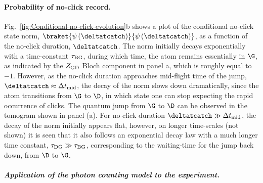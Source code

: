 \paragraph{Probability of no-click record.}

Fig.~\ref{fig:Conditional-no-click-evolution}b shows a plot of the
conditional no-click state norm, $\braket{\psi\left(\deltatcatch\right)}{\psi\left(\deltatcatch\right)}$,
as a function of the no-click duration, $\deltatcatch$. The norm
initially decays exponentially with a time-constant $\tau_{{\rm BG}}$,
during which time, the atom remains essentially in $\G$, as indicated
by the $Z_{{\rm GD}}$ Bloch component in panel a, which is roughly
equal to $-1$. However, as the no-click duration approaches  mid-flight
time of the jump, $\deltatcatch\approx\Delta t_{{\rm mid}}$, the
decay of the norm slows down dramatically, since the atom transitions
from $\G$ to $\D$, in which state one can stop expecting the rapid
occurrence of clicks. The quantum jump from $\G$ to $\D$ can be
observed in the tomogram shown in panel (a). For no-click duration
$\deltatcatch\gg\Delta t_{{\rm mid}}$, the decay of the norm initially
appears flat, however, on longer time-scales (not shown) it is seen
that it also follows an exponential decay law with a much longer time
constant, $\tau_{{\rm DG}}\gg\tau_{{\rm BG}}$, corresponding to the
waiting-time for the jump back down, from $\D$ to $\G$.

\paragraph{\textit{\emph{Application of the photon counting model to the experiment.}}}

